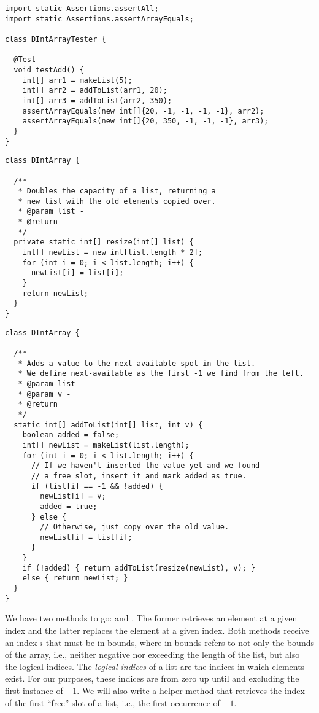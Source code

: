 \begin{lstlisting}[language=MyJava]
import static Assertions.assertAll;
import static Assertions.assertArrayEquals;

class DIntArrayTester {

  @Test
  void testAdd() {
    int[] arr1 = makeList(5);
    int[] arr2 = addToList(arr1, 20);
    int[] arr3 = addToList(arr2, 350);
    assertArrayEquals(new int[]{20, -1, -1, -1, -1}, arr2);
    assertArrayEquals(new int[]{20, 350, -1, -1, -1}, arr3);
  }
}
\end{lstlisting}

\begin{lstlisting}[language=MyJava]
class DIntArray {

  /**
   * Doubles the capacity of a list, returning a 
   * new list with the old elements copied over.
   * @param list - 
   * @return
   */
  private static int[] resize(int[] list) {
    int[] newList = new int[list.length * 2];
    for (int i = 0; i < list.length; i++) {
      newList[i] = list[i];
    }
    return newList;
  }
}
\end{lstlisting}

\begin{lstlisting}[language=MyJava]
class DIntArray {

  /**
   * Adds a value to the next-available spot in the list.
   * We define next-available as the first -1 we find from the left.
   * @param list - 
   * @param v - 
   * @return
   */
  static int[] addToList(int[] list, int v) {
    boolean added = false;
    int[] newList = makeList(list.length);
    for (int i = 0; i < list.length; i++) {
      // If we haven't inserted the value yet and we found
      // a free slot, insert it and mark added as true.
      if (list[i] == -1 && !added) {
        newList[i] = v;
        added = true;
      } else {
        // Otherwise, just copy over the old value.
        newList[i] = list[i];
      }
    }
    if (!added) { return addToList(resize(newList), v); } 
    else { return newList; }
  }
}
\end{lstlisting}

We have two methods to go:  and . The former retrieves an element at a given index and the latter replaces the element at a given index. Both methods receive an index $i$ that must be in-bounds, where in-bounds refers to not only the bounds of the array, i.e., neither negative nor exceeding the length of the list, but also the logical indices. The \emph{logical indices} of a list are the indices in which elements exist. For our purposes, these indices are from zero up until and excluding the first instance of $-1$. We will also write a helper method that retrieves the index of the first ``free'' slot of a list, i.e., the first occurrence of $-1$.


